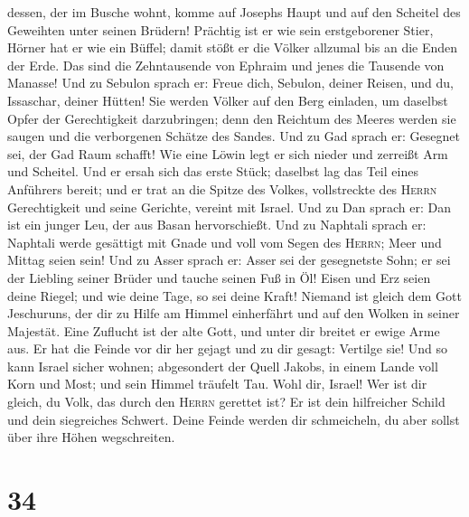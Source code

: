 dessen, der im Busche wohnt, komme auf Josephs Haupt und auf den
Scheitel des Geweihten unter seinen Brüdern!  Prächtig
ist er wie sein erstgeborener Stier, Hörner hat er wie ein Büffel; damit
stößt er die Völker allzumal bis an die Enden der Erde. Das sind die
Zehntausende von Ephraim und jenes die Tausende von Manasse!
 Und zu Sebulon sprach er: Freue dich, Sebulon, deiner
Reisen, und du, Issaschar, deiner Hütten!  Sie werden
Völker auf den Berg einladen, um daselbst Opfer der Gerechtigkeit
darzubringen; denn den Reichtum des Meeres werden sie saugen und die
verborgenen Schätze des Sandes.  Und zu Gad sprach er:
Gesegnet sei, der Gad Raum schafft! Wie eine Löwin legt er sich nieder
und zerreißt Arm und Scheitel.  Und er ersah sich das
erste Stück; daselbst lag das Teil eines Anführers bereit; und er trat
an die Spitze des Volkes, vollstreckte des \textsc{Herrn} Gerechtigkeit
und seine Gerichte, vereint mit Israel.  Und zu Dan
sprach er: Dan ist ein junger Leu, der aus Basan hervorschießt.
 Und zu Naphtali sprach er: Naphtali werde gesättigt mit
Gnade und voll vom Segen des \textsc{Herrn}; Meer und Mittag seien sein!
 Und zu Asser sprach er: Asser sei der gesegnetste Sohn;
er sei der Liebling seiner Brüder und tauche seinen Fuß in Öl!
 Eisen und Erz seien deine Riegel; und wie deine Tage, so
sei deine Kraft!  Niemand ist gleich dem Gott Jeschuruns,
der dir zu Hilfe am Himmel einherfährt und auf den Wolken in seiner
Majestät.  Eine Zuflucht ist der alte Gott, und unter dir
breitet er ewige Arme aus. Er hat die Feinde vor dir her gejagt und zu
dir gesagt: Vertilge sie!  Und so kann Israel sicher
wohnen; abgesondert der Quell Jakobs, in einem Lande voll Korn und Most;
und sein Himmel träufelt Tau.  Wohl dir, Israel! Wer ist
dir gleich, du Volk, das durch den \textsc{Herrn} gerettet ist? Er ist
dein hilfreicher Schild und dein siegreiches Schwert. Deine Feinde
werden dir schmeicheln, du aber sollst über ihre Höhen wegschreiten.

\hypertarget{section-33}{%
\section{34}\label{section-33}}


